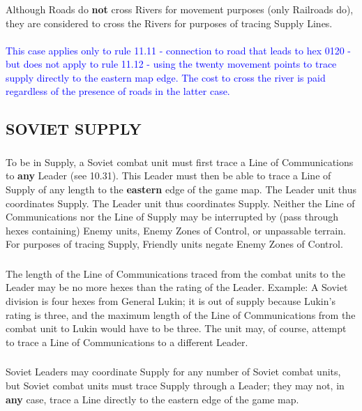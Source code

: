 \subsubsection{} Although Roads do \textbf{not} cross Rivers for movement purposes (only Railroads do), they are considered to cross the Rivers for purposes of tracing Supply Lines.
\nobreak\\\\
\textcolor{blue}{This case applies only to rule 11.11 - connection to road that leads to hex 0120 - but does not apply to rule 11.12 - using the twenty movement points to trace supply directly to the eastern map edge. The cost to cross the river is paid regardless of the presence of roads in the latter case.}

\subsection{SOVIET SUPPLY}

\subsubsection{} To be in Supply, a Soviet combat unit must first trace a Line of Communications to \textbf{any} Leader (see 10.31). This Leader must then be able to trace a Line of Supply of any length to the \textbf{eastern} edge of the game map. The Leader unit thus coordinates Supply. The Leader unit thus coordinates Supply. Neither the Line of Communications nor the Line of Supply may be interrupted by (pass through hexes containing) Enemy units, Enemy Zones of Control, or unpassable terrain. For purposes of tracing Supply, Friendly units negate Enemy Zones of Control.

\subsubsection{} The length of the Line of Communications traced from the combat units to the Leader may be no more hexes than the rating of the Leader. Example: A Soviet division is four hexes from General Lukin; it is out of supply because Lukin's rating is three, and the maximum length of the Line of Communications from the combat unit to Lukin would have to be three. The unit may, of course, attempt to trace a Line of Communications to a different Leader.

\subsubsection{} Soviet Leaders may coordinate Supply for any number of Soviet combat units, but Soviet combat units must trace Supply through a Leader; they may not, in \textbf{any} case, trace a Line directly to the eastern edge of the game map.

